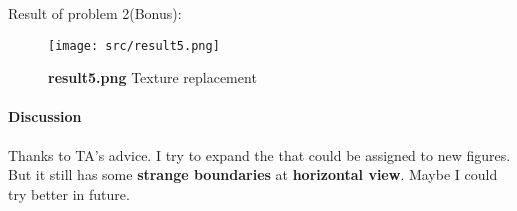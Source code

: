 Result of problem 2(Bonus): 
\begin{figure}
    \centering
    \texttt{[image: src/result5.png]}
    \caption{\textbf{result5.png} Texture replacement}
    \label{result5}
\end{figure}

\paragraph{Discussion}
Thanks to TA's advice. I try to expand the  that could be assigned to new figures.
But it still has some \textbf{strange boundaries} at \textbf{horizontal view}.
Maybe I could try better in future.

